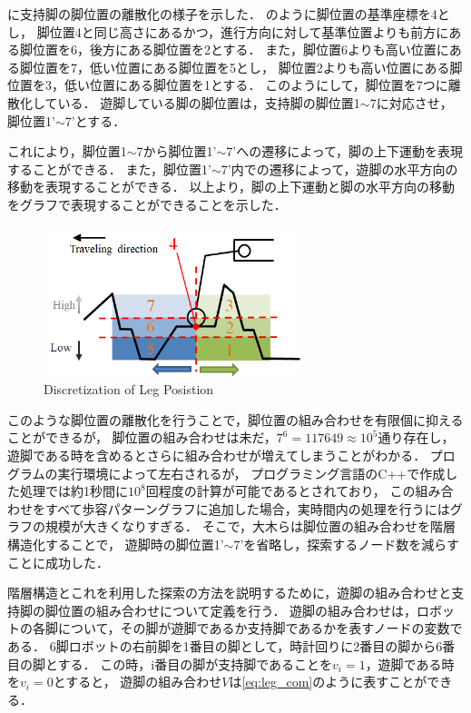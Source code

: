 に支持脚の脚位置の離散化の様子を示した．
のように脚位置の基準座標を4とし，
脚位置4と同じ高さにあるかつ，進行方向に対して基準位置よりも前方にある脚位置を6，後方にある脚位置を2とする．
また，脚位置6よりも高い位置にある脚位置を7，低い位置にある脚位置を5とし，
脚位置2よりも高い位置にある脚位置を3，低い位置にある脚位置を1とする．
このようにして，脚位置を7つに離散化している．
遊脚している脚の脚位置は，支持脚の脚位置1$\sim$7に対応させ，脚位置1'$\sim$7'とする．%

これにより，脚位置1$\sim$7から脚位置1'$\sim$7'への遷移によって，脚の上下運動を表現することができる．
また，脚位置1'$\sim$7'内での遷移によって，遊脚の水平方向の移動を表現することができる．
以上より，脚の上下運動と脚の水平方向の移動をグラフで表現することができることを示した．

\begin{figure}[b]
  \begin{center}
    \includegraphics[width=75mm, clip]{figure/chapter2/discretization_of_leg_pos.png}
    \caption{Discretization of Leg Posistion}
    \label{fig:discretization} %
  \end{center}
\end{figure}

このような脚位置の離散化を行うことで，脚位置の組み合わせを有限個に抑えることができるが，
脚位置の組み合わせは未だ，$7^6 = 117649 \approx 10^5$通り存在し，
遊脚である時を含めるとさらに組み合わせが増えてしまうことがわかる．
プログラムの実行環境によって左右されるが，
プログラミング言語のC++で作成した処理では約1秒間に$10^8$回程度の計算が可能であるとされており\cite{Program_Challenge_Book}，
この組み合わせをすべて歩容パターングラフに追加した場合，実時間内の処理を行うにはグラフの規模が大きくなりすぎる．
そこで，大木らは脚位置の組み合わせを階層構造化することで，
遊脚時の脚位置1'$\sim$7'を省略し，探索するノード数を減らすことに成功した\cite{Oki_Graph_search}．

階層構造とこれを利用した探索の方法を説明するために，遊脚の組み合わせと支持脚の脚位置の組み合わせについて定義を行う．
遊脚の組み合わせは，ロボットの各脚について，その脚が遊脚であるか支持脚であるかを表すノードの変数である．
6脚ロボットの右前脚を1番目の脚として，時計回りに2番目の脚から6番目の脚とする．
この時，i番目の脚が支持脚であることを$v_i = 1$，遊脚である時を$v_i = 0$とすると，
遊脚の組み合わせ$V$は\eqref{eq:leg_com}のように表すことができる．

